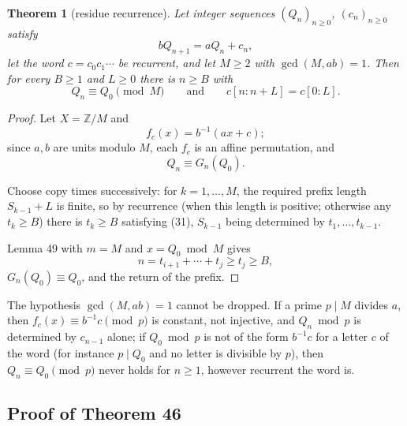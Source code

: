 \documentclass[11pt,reqno]{amsart}
\newtheorem{theorem}{Theorem}
\theoremstyle{definition}
\theoremstyle{remark}
\begin{document}
\begin{samepage}
\begin{theorem}[residue recurrence]\leavevmode\label{thm:50}
Let integer sequences
\((Q_n)_{n\ge0}\), \((c_n)_{n\ge0}\) satisfy
\[
bQ_{n+1}=aQ_n+c_n,
\]
let
the word \(c=c_0c_1\cdots\) be recurrent, and let \(M\ge2\) with
\(\gcd(M,ab)=1\). Then for every \(B\ge1\) and \(L\ge0\) there is
\(n\ge B\) with
\[
Q_n\equiv Q_0\pmod M\qquad \text{and}\qquad c[n:n+L]=c[0:L].
\]
\label{thm-end:50}
\end{theorem}
\end{samepage}

\begin{proof}\leavevmode\label{proof:50}
Let \(X=\mathbb Z/M\) and
\[
f_c(x)=b^{-1}(ax+c);
\]
since
\(a,b\) are units modulo \(M\), each \(f_c\) is an affine permutation,
and
\[
Q_n\equiv G_n(Q_0).
\]

Choose copy times successively: for
\(k=1,\ldots,M\), the required prefix length \(S_{k-1}+L\) is finite, so
by recurrence (when this length is positive; otherwise any \(t_k\ge B\))
there is \(t_k\ge B\) satisfying (31), \(S_{k-1}\) being determined by
\(t_1,\ldots,t_{k-1}\).

Lemma 49 with \(m=M\) and \(x=Q_0\bmod M\)
gives
\[
n=t_{i+1}+\cdots+t_j\ge t_j\ge B,
\]
\(G_n(Q_0)\equiv Q_0\), and
the return of the prefix. \qedhere
\end{proof}

The hypothesis \(\gcd(M,ab)=1\) cannot be dropped. If a prime
\(p\mid M\) divides \(a\), then \(f_c(x)\equiv b^{-1}c\pmod p\) is
constant, not injective, and \(Q_n\bmod p\) is determined by \(c_{n-1}\)
alone; if \(Q_0\bmod p\) is not of the form \(b^{-1}c\) for a letter
\(c\) of the word (for instance \(p\mid Q_0\) and no letter is divisible
by \(p\)), then \(Q_n\equiv Q_0\pmod p\) never holds for \(n\ge1\),
however recurrent the word is.

\subsection{Proof of Theorem 46}\label{sec:B.3}
\end{document}
